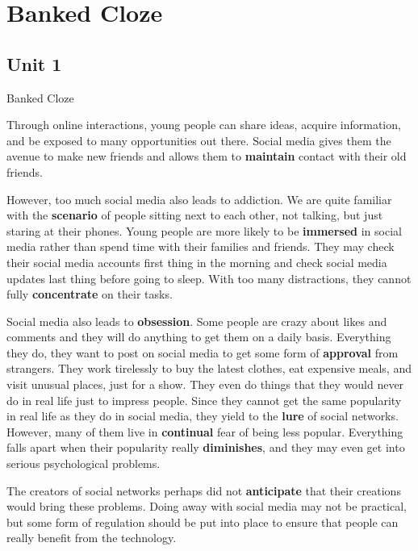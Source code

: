 \section{Banked Cloze}
\subsection{Unit 1}

\begin{question}{Banked Cloze}

Through online interactions, young people can share ideas, acquire information, and be exposed to many opportunities out there. Social media gives them the avenue to make new friends and allows them to 
\textbf{\color{red} maintain} contact with their old friends.
 
\vspace{1em}

However, too much social media also leads to addiction. We are quite familiar with the \textbf{\color{red} scenario} of people sitting next to each other, not talking, but just staring at their phones. Young people are more likely to be \textbf{\color{red} immersed} in social media rather than spend time with their families and friends. They may check their social media accounts first thing in the morning and check social media updates last thing before going to sleep. With too many distractions, they cannot fully \textbf{\color{red} concentrate} on their tasks. 

\vspace{1em}

Social media also leads to \textbf{\color{red} obsession}. Some people are crazy about likes and comments and they will do anything to get them on a daily basis. Everything they do, they want to post on social media to get some form of \textbf{\color{red} approval} from strangers. They work tirelessly to buy the latest clothes, eat expensive meals, and visit unusual places, just for a show. They even do things that they would never do in real life just to impress people. Since they cannot get the same popularity in real life as they do in social media, they yield to the \textbf{\color{red} lure} of social networks. However, many of them live in \textbf{\color{red} continual} fear of being less popular. Everything falls apart when their popularity really \textbf{\color{red} diminishes}, and they may even get into serious psychological problems.

\vspace{1em}

The creators of social networks perhaps did not \textbf{\color{red} anticipate}
that their creations would bring these problems. Doing away with social media may not be practical, but some form of regulation should be put into place to ensure that people can really benefit from the technology.

\end{question}

